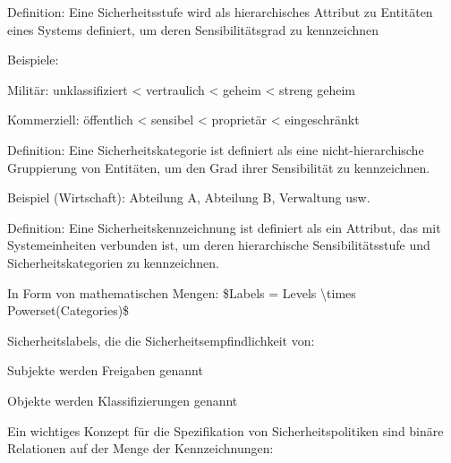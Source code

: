 \documentclass[a4paper]{article}
\begin{document}
\begin{multicols}{3}
      \begin{itemize*}
            \item
            Definition: Eine Sicherheitsstufe wird als hierarchisches Attribut zu
            Entitäten eines Systems definiert, um deren Sensibilitätsgrad zu
            kennzeichnen

            \begin{itemize*}
                  \item Beispiele:
                  \begin{itemize*} \item Militär: unklassifiziert \textless{} vertraulich \textless{} geheim \textless{} streng geheim \item Kommerziell: öffentlich \textless{} sensibel \textless{} proprietär \textless{} eingeschränkt \end{itemize*}
            \end{itemize*}
            \item
            Definition: Eine Sicherheitskategorie ist definiert als eine
            nicht-hierarchische Gruppierung von Entitäten, um den Grad ihrer
            Sensibilität zu kennzeichnen.

            \begin{itemize*}
                  \item Beispiel (Wirtschaft): Abteilung A, Abteilung B, Verwaltung usw.
            \end{itemize*}
            \item
            Definition: Eine Sicherheitskennzeichnung ist definiert als ein
            Attribut, das mit Systemeinheiten verbunden ist, um deren
            hierarchische Sensibilitätsstufe und Sicherheitskategorien zu
            kennzeichnen.

            \begin{itemize*}
                  \item In Form von mathematischen Mengen: \$Labels = Levels \textbackslash times Powerset(Categories)\$
            \end{itemize*}
            \item
            Sicherheitslabels, die die Sicherheitsempfindlichkeit von:

            \begin{itemize*}
                  \item Subjekte werden Freigaben genannt
                  \item Objekte werden Klassifizierungen genannt
            \end{itemize*}
            \item
            Ein wichtiges Konzept für die Spezifikation von Sicherheitspolitiken
            sind binäre Relationen auf der Menge der Kennzeichnungen:


\end{itemize*}
\end{multicols}
\end{document}
